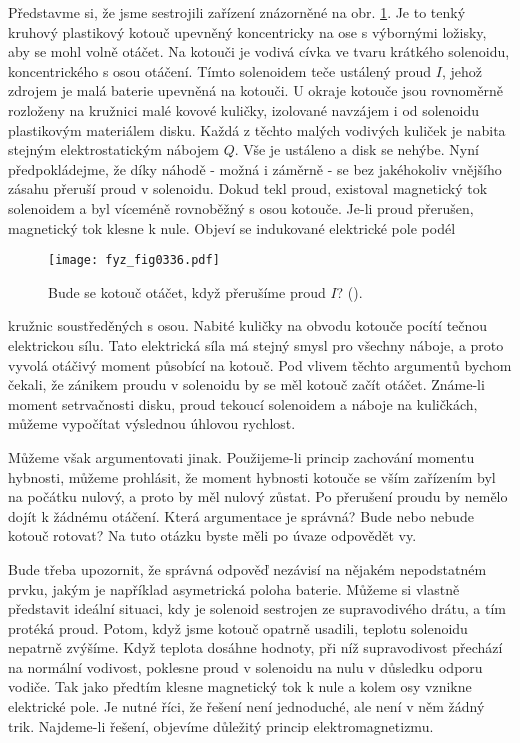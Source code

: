   Představme si, že jsme sestrojili zařízení znázorněné na obr. \ref{fyz:fig0336}. Je to tenký 
  kruhový plastikový kotouč upevněný koncentricky na ose s výbornými ložisky, aby se mohl volně 
  otáčet. Na kotouči je vodivá cívka ve tvaru krátkého solenoidu, koncentrického s osou otáčení. 
  Tímto solenoidem teče ustálený proud \(I\), jehož zdrojem je malá baterie upevněná na kotouči. U 
  okraje kotouče jsou rovnoměrně rozloženy na kružnici malé kovové kuličky, izolované navzájem i od 
  solenoidu plastikovým materiálem disku. Každá z těchto malých vodivých kuliček je nabita stejným 
  elektrostatickým nábojem \(Q\). Vše je ustáleno a disk se nehýbe. Nyní předpokládejme, že díky 
  náhodě - možná i záměrně - se bez jakéhokoliv vnějšího zásahu přeruší proud v solenoidu. Dokud 
  tekl proud, existoval magnetický tok solenoidem a byl víceméně rovnoběžný s osou kotouče. Je-li 
  proud přerušen, magnetický tok klesne k nule. Objeví se indukované elektrické pole podél
  \begin{figure}[ht!]  %
    \centering
    \texttt{[image: fyz\_fig0336.pdf]}
    \caption{Bude se kotouč otáčet, když přerušíme proud \(I\)?
             (\cite[s.~300]{Feynman02}).}
    \label{fyz:fig0336}
  \end{figure}
  kružnic soustředěných s osou. Nabité kuličky na obvodu kotouče pocítí tečnou elektrickou sílu. 
  Tato elektrická síla má stejný smysl pro všechny náboje, a proto vyvolá otáčivý moment působící 
  na kotouč. Pod vlivem těchto argumentů bychom čekali, že zánikem proudu v solenoidu by se měl 
  kotouč začít otáčet. Známe-li moment setrvačnosti disku, proud tekoucí solenoidem a náboje
  na kuličkách, můžeme vypočítat výslednou úhlovou rychlost.
  
  Můžeme však argumentovati jinak. Použijeme-li princip zachování momentu hybnosti, můžeme 
  prohlásit, že moment hybnosti kotouče se vším zařízením byl na počátku nulový, a proto by měl 
  nulový zůstat. Po přerušení proudu by nemělo dojít k žádnému otáčení. Která argumentace je 
  správná? Bude nebo nebude kotouč rotovat? Na tuto otázku byste měli po úvaze odpovědět vy.
  
  Bude třeba upozornit, že správná odpověď nezávisí na nějakém nepodstatném prvku, jakým je 
  například asymetrická poloha baterie. Můžeme si vlastně představit ideální situaci, kdy je 
  solenoid sestrojen ze supravodivého drátu, a tím protéká proud. Potom, když jsme kotouč opatrně 
  usadili, teplotu solenoidu nepatrně zvýšíme. Když teplota dosáhne hodnoty, při níž supravodivost 
  přechází na normální vodivost, poklesne proud v solenoidu na nulu v důsledku odporu vodiče. Tak 
  jako předtím klesne magnetický tok k nule a kolem osy vznikne elektrické pole. Je nutné říci, že 
  řešení není jednoduché, ale není v něm žádný trik. Najdeme-li řešení, objevíme důležitý princip 
  elektromagnetizmu.
  
